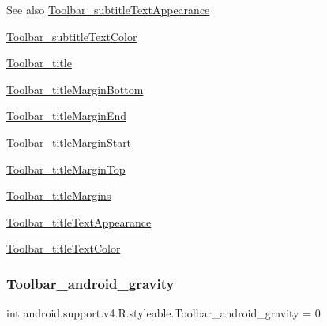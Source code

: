 \begin{DoxySeeAlso}{See also}
\hyperlink{classandroid_1_1support_1_1v4_1_1R_1_1styleable_a6575166e631245fde7c74544cb270d07}{Toolbar\+\_\+subtitle\+Text\+Appearance} 

\hyperlink{classandroid_1_1support_1_1v4_1_1R_1_1styleable_ab4fc0b1af097899c23a2cafac5d295c6}{Toolbar\+\_\+subtitle\+Text\+Color} 

\hyperlink{classandroid_1_1support_1_1v4_1_1R_1_1styleable_a028dd183d392a34cc1188283e78f799d}{Toolbar\+\_\+title} 

\hyperlink{classandroid_1_1support_1_1v4_1_1R_1_1styleable_af61d7365bb54301d95ac8b1dbb70d637}{Toolbar\+\_\+title\+Margin\+Bottom} 

\hyperlink{classandroid_1_1support_1_1v4_1_1R_1_1styleable_a372ca0431ab4693a3248600ed75e4c10}{Toolbar\+\_\+title\+Margin\+End} 

\hyperlink{classandroid_1_1support_1_1v4_1_1R_1_1styleable_a879f1e4b1e7a561bfd7bcbcd1d237762}{Toolbar\+\_\+title\+Margin\+Start} 

\hyperlink{classandroid_1_1support_1_1v4_1_1R_1_1styleable_a4d1ca9c426378fcd3df61341e7cd11f1}{Toolbar\+\_\+title\+Margin\+Top} 

\hyperlink{classandroid_1_1support_1_1v4_1_1R_1_1styleable_acb7d5ee2c69e4de526bd73e36e16b455}{Toolbar\+\_\+title\+Margins} 

\hyperlink{classandroid_1_1support_1_1v4_1_1R_1_1styleable_a87e1a78ebc943729c097ee28bda542cd}{Toolbar\+\_\+title\+Text\+Appearance} 

\hyperlink{classandroid_1_1support_1_1v4_1_1R_1_1styleable_a249158d0b5533c28e927718a4311d4fb}{Toolbar\+\_\+title\+Text\+Color} 
\end{DoxySeeAlso}
\mbox{\label{classandroid_1_1support_1_1v4_1_1R_1_1styleable_ac91be82152f33f614697a5b2014cb489}} 
\subsubsection{\texorpdfstring{Toolbar\+\_\+android\+\_\+gravity}{Toolbar\_android\_gravity}}
{\footnotesize\ttfamily int android.\+support.\+v4.\+R.\+styleable.\+Toolbar\+\_\+android\+\_\+gravity = 0\hspace{0.3cm}{\ttfamily [static]}}

